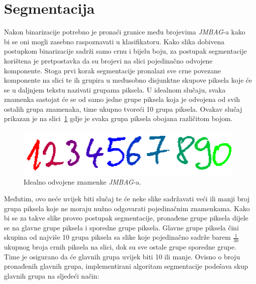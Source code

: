 \section{Segmentacija}
\label{sec:segmentacija}
Nakon binarizacije potrebno je pronaći granice među brojevima \emph{JMBAG}-a kako bi se oni mogli zasebno raspoznavati
u klasifikatoru. Kako slika dobivena postupkom binarizacije sadrži samo crnu i bijelu boju, za postupak segmentacije
korištena je pretpostavka da su brojevi na slici pojedinačno odvojene komponente. Stoga prvi korak segmentacije
pronalazi sve crne povezane komponente na slici te ih grupira u međusobno disjunktne skupove piksela koje će se u
daljnjem tekstu nazivati grupama piksela. U idealnom slučaju, svaka znamenka sastojat će se od samo jedne grupe piksela
koja je odvojena od svih ostalih grupa znamenaka, time ukupno tvoreći 10 grupa piksela. Ovakav slučaj prikazan je na
slici\ \ref{fig:ideal-segmentation} gdje je svaka grupa piksela obojana različitom bojom.
\begin{figure}[htb]
    \centering
    \includegraphics[width=12cm]{images/ideal-segmentation.png}
    \caption{Idealno odvojene znamenke \emph{JMBAG}-a.}
    \label{fig:ideal-segmentation}
\end{figure}
Međutim, ovo neće uvijek biti slučaj te će neke slike sadržavati veći ili manji broj grupa piksela koje ne moraju nužno
odgovarati pojedinačnim znamenkama. Kako bi se za takve slike proveo postupak segmentacije, pronađene grupe piksela
dijele se na glavne grupe piksela i sporedne grupe piksela. Glavne grupe piksela čini skupina od najviše 10 grupa
piksela sa slike koje pojedinačno sadrže barem $\frac{1}{30}$ ukupnog broja crnih piksela na slici, dok su sve ostale
grupe sporedne grupe. Time je osigurano da će glavnih grupa uvijek biti 10 ili manje. Ovisno o broju pronađenih glavnih
grupa, implementirani algoritam segmentacije podešava skup glavnih grupa na sljedeći način:
